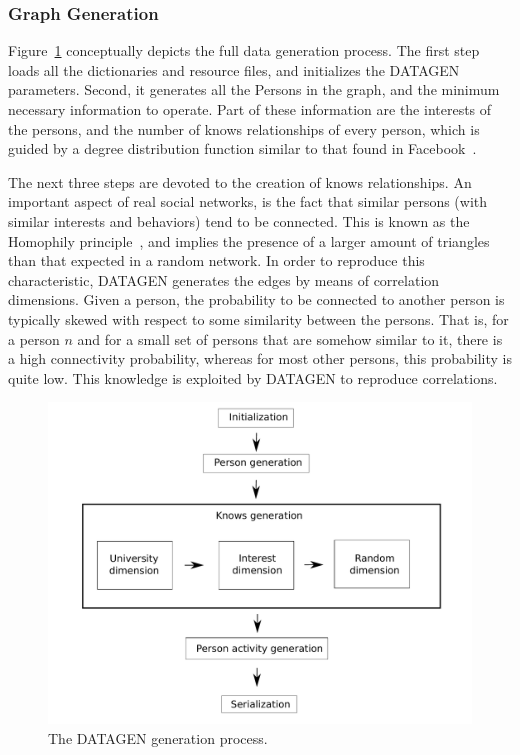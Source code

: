 \subsubsection{Graph Generation}

Figure~\ref{figure:generation_process} conceptually depicts the full data
generation process. The first step loads all the dictionaries and resource
files, and initializes the DATAGEN parameters.  Second, it generates all the
Persons in the graph, and the minimum necessary information to operate. Part of
these information are the interests of the persons, and the number of knows
relationships of every person, which is guided by a degree distribution
function similar to that found in Facebook~\cite{facebook_anatomy}.

The next three steps are devoted to the creation of knows relationships.  An
important aspect of real social networks, is the fact that similar persons
(with similar interests and behaviors) tend to be connected. This is known as
the Homophily principle~\cite{mcpherson2001birds}, and implies the presence of
a larger amount of triangles than that expected in a random network. In order
to reproduce this characteristic, DATAGEN generates the edges by means of
correlation dimensions.  Given a person, the probability to be connected to
another person is typically skewed with respect to some similarity between the
persons. That is, for a person $n$ and for a small set of persons that are
somehow similar to it, there is a high connectivity probability, whereas for
most other persons, this probability is quite low. This knowledge is
exploited by DATAGEN to reproduce correlations.

\begin{figure}[H]
    \centering
    \includegraphics[width=1\linewidth]{figures/sndg/execution.pdf}
    \caption{The DATAGEN generation process.}
    \label{figure:generation_process}
\end{figure}

